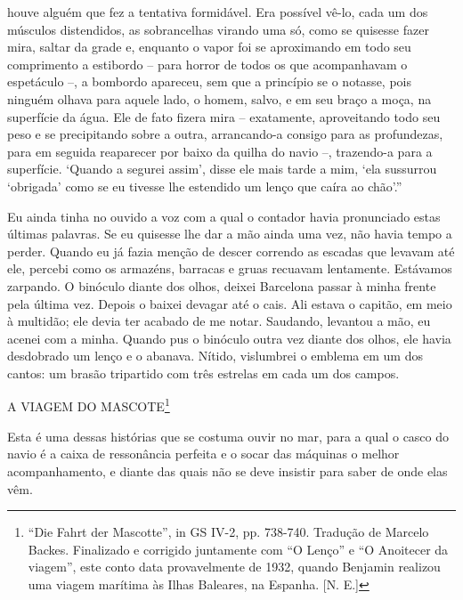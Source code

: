 houve alguém que fez a tentativa formidável. Era possível vê-lo, cada um
dos músculos distendidos, as sobrancelhas virando uma só, como se
quisesse fazer mira, saltar da grade e, enquanto o vapor foi se
aproximando em todo seu comprimento a estibordo -- para horror de todos
os que acompanhavam o espetáculo --, a bombordo apareceu, sem que a
princípio se o notasse, pois ninguém olhava para aquele lado, o homem,
salvo, e em seu braço a moça, na superfície da água. Ele de fato fizera
mira -- exatamente, aproveitando todo seu peso e se precipitando sobre a
outra, arrancando-a consigo para as profundezas, para em seguida
reaparecer por baixo da quilha do navio --, trazendo-a para a
superfície. `Quando a segurei assim', disse ele mais tarde a mim, `ela
sussurrou `obrigada' como se eu tivesse lhe estendido um lenço que caíra
ao chão'.''

Eu ainda tinha no ouvido a voz com a qual o contador havia pronunciado
estas últimas palavras. Se eu quisesse lhe dar a mão ainda uma vez, não
havia tempo a perder. Quando eu já fazia menção de descer correndo as
escadas que levavam até ele, percebi como os armazéns, barracas e gruas
recuavam lentamente. Estávamos zarpando. O binóculo diante dos olhos,
deixei Barcelona passar à minha frente pela última vez. Depois o baixei
devagar até o cais. Ali estava o capitão, em meio à multidão; ele devia
ter acabado de me notar. Saudando, levantou a mão, eu acenei com a
minha. Quando pus o binóculo outra vez diante dos olhos, ele havia
desdobrado um lenço e o abanava. Nítido, vislumbrei o emblema em um dos
cantos: um brasão tripartido com três estrelas em cada um dos campos.

A VIAGEM DO MASCOTE\footnote{``Die Fahrt der Mascotte'', in GS IV-2, pp.
  738-740. Tradução de Marcelo Backes. Finalizado e corrigido juntamente
  com ``O Lenço'' e ``O Anoitecer da viagem'', este conto data
  provavelmente de 1932, quando Benjamin realizou uma viagem marítima às
  Ilhas Baleares, na Espanha. {[}N. E.{]}}

Esta é uma dessas histórias que se costuma ouvir no mar, para a qual o
casco do navio é a caixa de ressonância perfeita e o socar das máquinas
o melhor acompanhamento, e diante das quais não se deve insistir para
saber de onde elas vêm.

